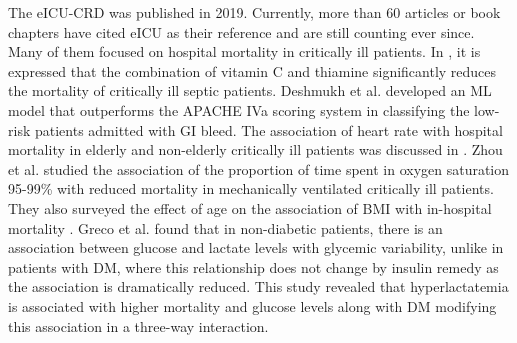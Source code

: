 The \acrlong{eICU-CRD} was published in 2019. Currently, more than 60 articles or book chapters have cited \acrshort{eICU} as their reference and are still counting ever since. Many of them focused on hospital mortality in critically ill patients. In \cite{byerly_vitamin_2020}, it is expressed that the combination of vitamin C and thiamine significantly reduces the mortality of critically ill septic patients. Deshmukh et al. \cite{deshmukh_explainable_2020} developed an \acrshort{ML} model that outperforms the \acrshort{APACHE} IVa scoring system in classifying the low-risk patients admitted with \acrfull{GI} bleed. The association of heart rate with hospital mortality in elderly and non-elderly critically ill patients was discussed in \cite{zhou_effect_2020}. Zhou et al. \cite{zhou_time_2020} studied the association of the proportion of time spent in oxygen saturation 95-99\% with reduced mortality in mechanically ventilated critically ill patients. They also surveyed the effect of age on the association of \acrfull{BMI} with in-hospital mortality \cite{zhou_obesity_2020}. Greco et al. \cite{greco_diabetes_2018} found that in non-diabetic patients, there is an association between glucose and lactate levels with glycemic variability, unlike in patients with \acrshort{DM}, where this relationship does not change by insulin remedy as the association is dramatically reduced. This study revealed that hyperlactatemia is associated with higher mortality and glucose levels along with \acrshort{DM} modifying this association in a three-way interaction.